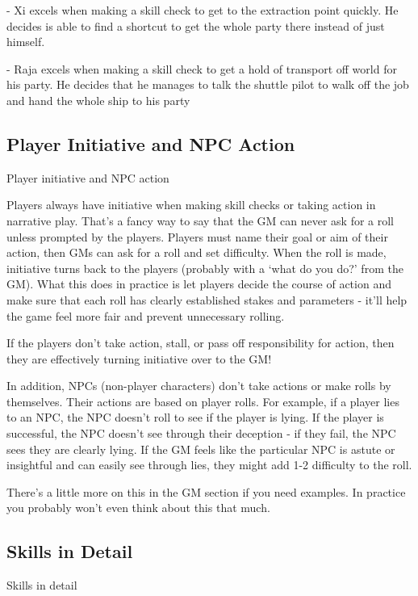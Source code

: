                                                                                                                     


         	- Xi excels when making a skill check to get to the extraction point quickly. He decides  
         is able to find a shortcut to get the whole party there instead of just himself.
 
         - Raja excels when making a skill check to get a hold of transport off world for his party.  
         He decides that he manages to talk the shuttle pilot to walk off the job and hand the  
         whole ship to his party
 
\subsection{Player Initiative and NPC Action}
                                 Player initiative and NPC action
 

Players always have initiative when making skill checks or taking action in narrative play. That’s  
a fancy way to say that the GM can never ask for a roll unless prompted by the players. Players  
must name their goal or aim of their action, then GMs can ask for a roll and set difficulty. When  
the roll is made, initiative turns back to the players (probably with a ‘what do you do?’ from the  
GM). What this does in practice is let players decide the course of action and make sure that  
each roll has clearly established stakes and parameters - it’ll help the game feel more fair and  
prevent unnecessary rolling.
 

If the players don’t take action, stall, or pass off responsibility for action, then they are  
effectively turning initiative over to the GM!
 

In addition, NPCs (non-player characters) don’t take actions or make rolls by themselves. Their  
actions are based on player rolls. For example, if a player lies to an NPC, the NPC doesn’t roll to  
see if the player is lying. If the player is successful, the NPC doesn’t see through their deception  
- if they fail, the NPC sees they are clearly lying. If the GM feels like the particular NPC is astute  
or insightful and can easily see through lies, they might add 1-2 difficulty to the roll.
 

There’s a little more on this in the GM section if you need examples. In practice you probably  
won’t even think about this that much.
 
\subsection{Skills in Detail}
                                               Skills in detail
 

